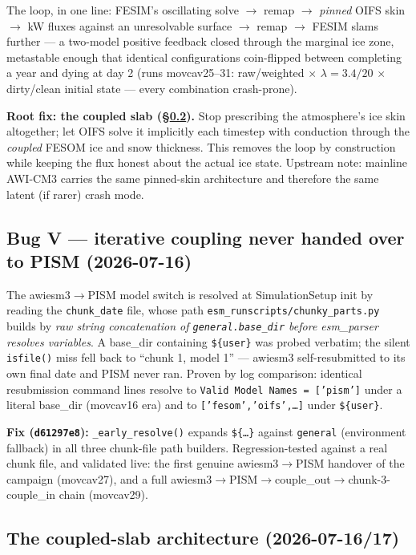 \documentclass[11pt,a4paper]{article}
\newcommand{\code}[1]{\texttt{\small #1}}
\begin{document}
The loop, in one line: FESIM's oscillating solve $\to$ remap $\to$ \emph{pinned} OIFS skin $\to$
kW fluxes against an unresolvable surface $\to$ remap $\to$ FESIM slams further --- a two-model
positive feedback closed through the marginal ice zone, metastable enough that identical
configurations coin-flipped between completing a year and dying at day 2 (runs movcav25--31:
raw/weighted $\times$ $\lambda\!=\!3.4/20$ $\times$ dirty/clean initial state --- every combination
crash-prone).

\textbf{Root fix: the coupled slab (\S\ref{sec:slab}).} Stop prescribing the atmosphere's ice skin
altogether; let OIFS solve it implicitly each timestep with conduction through the \emph{coupled}
FESOM ice and snow thickness. This removes the loop by construction while keeping the flux honest
about the actual ice state. Upstream note: mainline AWI-CM3 carries the same pinned-skin
architecture and therefore the same latent (if rarer) crash mode.

\subsection{Bug V --- iterative coupling never handed over to PISM (2026-07-16)}\label{sec:bug5}

The awiesm3$\to$PISM model switch is resolved at SimulationSetup init by reading the
\code{chunk\_date} file, whose path \code{esm\_runscripts/chunky\_parts.py} builds by \emph{raw
string concatenation of \code{general.base\_dir} before esm\_parser resolves variables}. A base\_dir
containing \code{\$\{user\}} was probed verbatim; the silent \code{isfile()} miss fell back to
``chunk 1, model 1'' --- awiesm3 self-resubmitted to its own final date and PISM never ran. Proven
by log comparison: identical resubmission command lines resolve to \code{Valid Model Names =
['pism']} under a literal base\_dir (movcav16 era) and to \code{['fesom','oifs',\ldots]} under
\code{\$\{user\}}.

\textbf{Fix (\code{d61297e8}):} \code{\_early\_resolve()} expands \code{\$\{\ldots\}} against
\code{general} (environment fallback) in all three chunk-file path builders. Regression-tested
against a real chunk file, and validated live: the first genuine awiesm3$\to$PISM handover of the
campaign (movcav27), and a full awiesm3$\to$PISM$\to$couple\_out$\to$chunk-3-couple\_in chain
(movcav29).

\subsection{The coupled-slab architecture (2026-07-16/17)}\label{sec:slab}
\end{document}
